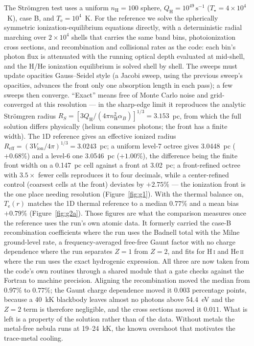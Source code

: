 \documentclass[twocolumn,linenumbers]{aastex702}
\newcommand{\Te}{T_{\mathrm{e}}}
\newcommand{\nH}{n_{\mathrm{H}}}
\newcommand{\QH}{Q_{\mathrm{H}}}
\begin{document}
The Str\"omgren test uses a uniform $\nH = 100$ sphere, $\QH =
10^{49}\,\mathrm{s^{-1}}$ ($T_\star = 4\times10^4$~K), case B, and
$\Te = 10^4$~K.  For the reference we solve the spherically symmetric
ionization-equilibrium equations directly, with a deterministic radial
marching over $2\times10^4$ shells that carries the same band bins,
photoionization cross sections, and recombination and collisional rates as
the code: each bin's photon flux is attenuated with the running optical
depth evaluated at mid-shell, and the H/He ionization equilibrium is
solved shell by shell.
The sweeps must update opacities Gauss--Seidel style (a Jacobi sweep,
using the previous sweep's opacities, advances the front only one
absorption length in each pass); a few sweeps then converge.  ``Exact'' means
free of Monte Carlo noise and grid-converged at this resolution --- in
the sharp-edge limit it reproduces the analytic Str\"omgren radius
$R_S = [3\QH/(4\pi \nH^2 \alpha_B)]^{1/3} = 3.153$~pc, from which the
full solution differs physically (helium consumes photons; the front has
a finite width).  The 1D reference
gives an effective ionized radius $R_{\mathrm{eff}} = (3V_{\mathrm{ion}}/
4\pi)^{1/3} = 3.0243$~pc; a uniform level-7 octree gives 3.0448~pc
($+0.68\%$) and a level-6 one 3.0546~pc ($+1.00\%$), the difference being the
finite front width on a 0.147~pc cell against a front at 3.02~pc; a
front-refined octree with $3.5\times$ fewer cells
reproduces it to four decimals, while a center-refined control (coarsest
cells at the front) deviates by $+2.75\%$ --- the ionization front is the
one place needing resolution (Figure~\ref{fig:g1}).  With the thermal
balance on, $\Te(r)$ matches the 1D thermal reference to a median $0.77\%$
and a mean bias $+0.79\%$ (Figure~\ref{fig:g2a}).  Those figures are what the
comparison measures once the reference uses the run's own atomic data.  It
formerly carried the \citet{huignedin1997} case-B recombination coefficients
where the run uses the Badnell total with the Milne ground-level rate, a
frequency-averaged free-free Gaunt factor with no charge dependence where the run
separates $Z = 1$ from $Z = 2$, and \citet{verner1996} fits for H\,\textsc{i}
and He\,\textsc{ii} where the run uses the exact hydrogenic expression.  All
three are now taken from the code's own routines through a shared module that a
gate checks against the Fortran to machine precision.  Aligning the
recombination moved the median from $0.97\%$ to $0.77\%$; the Gaunt charge
dependence moved it $0.003$ percentage points, because a 40~kK blackbody leaves
almost no photons above 54.4~eV and the $Z = 2$ term is therefore negligible, and
the cross sections moved it $0.011$.  What is left is a property of the solution
rather than of the data.  Without metals the
metal-free nebula runs at 19--24~kK, the known overshoot that motivates the
trace-metal cooling.
\end{document}
